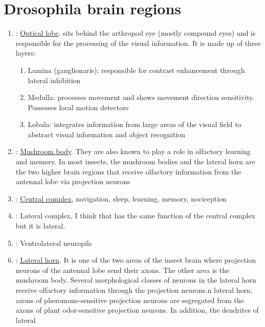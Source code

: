 \section{Drosophila brain regions}

\begin{enumerate}
    \item {}: \href{https://en.wikipedia.org/wiki/Optic_lobe_(arthropods)}{Optical lobe}. sits behind the arthropod eye (mostly compound eyes) 
        and is responsible for the processing of the visual information. It is made up of three layers:
        \begin{enumerate}
            \item Lamina (ganglionaris): responsible for contrast enhancement through lateral inhibition
            \item Medulla: processes movement and shows movement direction sensitivity. Possesses local motion detectors
            \item Lobula: integrates information from large areas of the visual field to abstract visual information and object recognition
        \end{enumerate}
    \item {}: \href{https://en.wikipedia.org/wiki/Mushroom_bodies}{Mushroom body}. They are also known to play a role in olfactory learning and memory. In most insects, 
        the mushroom bodies and the lateral horn are the two higher brain regions that receive olfactory information from the antennal lobe via projection neurons
    \item {}: \href{https://www.sdbonline.org/sites/fly/aimorph/centralcomplex.htm}{Central complex}, navigation, sleep, learning, memory, nociception
    \item {}: Lateral complex, I think that has the same function of the central complex but it is 
        lateral.
    \item {}: Ventrolateral neuropils
    \item {}: \href{https://en.wikipedia.org/wiki/Lateral_horn_of_insect_brain}{Lateral horn}.  
        It is one of the two areas of the insect brain where projection neurons of the antennal lobe send their axons. The other area is the mushroom body.
         Several morphological classes of neurons in the lateral horn receive olfactory information through the projection neurons.n lateral horn, axons of 
         pheromone-sensitive projection neurons are segregated from the axons of plant odor-sensitive projection neurons. In addition, the dendrites of lateral 

\end{enumerate}
